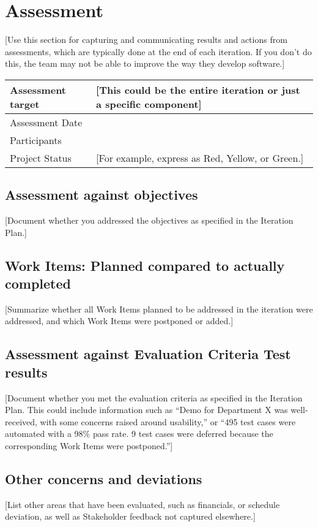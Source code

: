 \documentclass[a4paper,notitlepage]{article}%
\begin{document}
\section{Assessment}

[Use this section for capturing and communicating results and actions from assessments, which are typically done at the end of each iteration. If you don’t do this, the team may not be able to improve the way they develop software.]

\noindent\begin{tabular}{|l|l|}
\hline
Assessment target & [This could be the entire iteration or just a specific component]\\\hline
Assessment Date & \\\hline
Participants & \\\hline
Project Status & [For example, express as Red, Yellow, or Green.]\\\hline
\end{tabular}

\subsection{ Assessment against objectives}
[Document whether you addressed the objectives as specified in the Iteration Plan.]
\subsection{	Work Items: Planned compared to actually completed}
[Summarize whether all Work Items planned to be addressed in the iteration were addressed, and which Work Items were postponed or added.]
\subsection{Assessment against Evaluation Criteria Test results}
[Document whether you met the evaluation criteria as specified in the Iteration Plan. This could include information such as “Demo for Department X was well-received, with some concerns raised around usability,” or “495 test cases were automated with a 98\% pass rate. 9 test cases were deferred because the corresponding Work Items were postponed.”]
\subsection{	Other concerns and deviations}
[List other areas that have been evaluated, such as financials, or schedule deviation, as well as Stakeholder feedback not captured elsewhere.]
\end{document}
